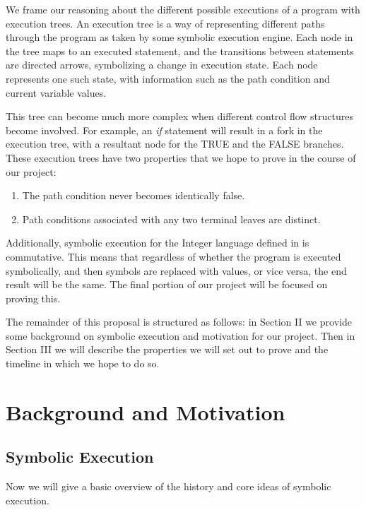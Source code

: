 \documentclass[11pt,conference]{IEEEtran}
\begin{document}
We frame our reasoning about the different possible executions of a program with execution trees. An execution tree is a way of representing different paths through the program as taken by some symbolic execution engine. Each node in the tree maps to an executed statement, and the transitions between statements are directed arrows, symbolizing a change in execution state. Each node represents one such state, with information such as the path condition and current variable values.

This tree can become much more complex when different control flow structures become involved. For example, an \textit{if} statement will result in a fork in the execution tree, with a resultant node for the TRUE and the FALSE branches. These execution trees have two properties that we hope to prove in the course of our project: 

\begin{enumerate}
    \item The path condition never becomes identically false.
    \item Path conditions associated with any two terminal leaves are distinct.
\end{enumerate}

Additionally, symbolic execution for the Integer language defined in \cite{b1} is commutative. This means that regardless of whether the program is executed symbolically, and then symbols are replaced with values, or vice versa, the end result will be the same. The final portion of our project will be focused on proving this.

The remainder of this proposal is structured as follows: in Section II we provide some background on symbolic execution and motivation for our project. Then in Section III we will describe the properties we will set out to prove and the timeline in which we hope to do so.


\section{Background and Motivation}

\subsection{Symbolic Execution}
Now we will give a basic overview of the history and core ideas of symbolic execution.
\end{document}
